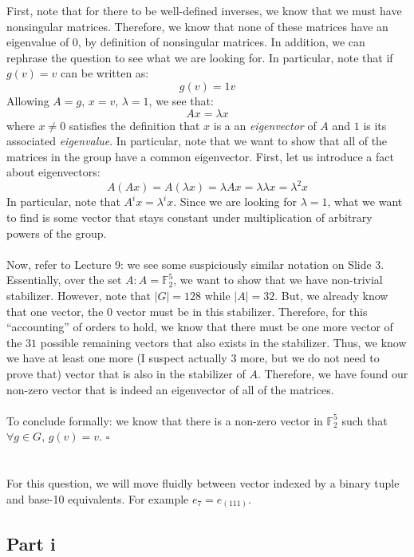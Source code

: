 \documentclass[letterpaper]{article}
\newcommand*{\QED}{\hfill\ensuremath{\square}}%
\begin{document}
First, note that for there to be well-defined inverses, we know that we must have nonsingular matrices.
Therefore, we know that none of these matrices have an eigenvalue of $ 0 $, by definition of nonsingular matrices.
In addition, we can rephrase the question to see what we are looking for.
In particular, note that if $ g(v) = v $ can be written as:
\[
g(v) = 1v
\]
Allowing $ A = g $, $ x = v $, $ \lambda = 1 $, we see that:
\[
Ax = \lambda x
\]
where $ x \neq 0 $ satisfies the definition that $ x $ is a an \textit{eigenvector} of $ A $ and $ 1 $ is its associated \textit{eigenvalue}.
In particular, note that we want to show that all of the matrices in the group have a common eigenvector.
First, let us introduce a fact about eigenvectors:
\[
A(Ax) = A(\lambda x) = \lambda Ax = \lambda \lambda x = \lambda^2 x
\]
In particular, note that $ A^i x = \lambda^i x $.
Since we are looking for $ \lambda = 1 $, what we want to find is some vector that stays constant under multiplication of arbitrary powers of the group.
\\ \\
Now, refer to Lecture 9: we see some suspiciously similar notation on Slide 3.
Essentially, over the set $ A : A = \mathbb{F}_2^5 $, we want to show that we have non-trivial stabilizer.
However, note that $ |G| = 128 $ while $ |A| = 32 $.
But, we already know that one vector, the $ 0 $ vector must be in this stabilizer.
Therefore, for this ``accounting'' of orders to hold, we know that there must be one more vector of the $ 31 $ possible remaining vectors that also exists in the stabilizer.
Thus, we know we have at least one more (I suspect actually $ 3 $ more, but we do not need to prove that) vector that is also in the stabilizer of $ A $.
Therefore, we have found our non-zero vector that is indeed an eigenvector of all of the matrices.
\\ \\
To conclude formally: we know that there is a non-zero vector in $ \mathbb{F}_2^5 $ such that $ \forall g \in G, \, g(v) = v $.
\QED{}

\section{}
\label{sec:Question5}

For this question, we will move fluidly between vector indexed by a binary tuple and base-10 equivalents.
For example $ e_7 = e_{(111)} $.

\subsection{Part i}
\label{subs:5Parti}
\end{document}
